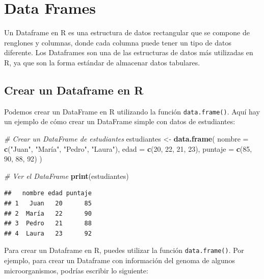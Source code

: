 \documentclass[
]{book}
\newenvironment{Shaded}{\begin{snugshade}}{\end{snugshade}}
\newcommand{\AttributeTok}[1]{\textcolor[rgb]{0.13,0.29,0.53}{#1}}
\newcommand{\CommentTok}[1]{\textcolor[rgb]{0.56,0.35,0.01}{\textit{#1}}}
\newcommand{\DecValTok}[1]{\textcolor[rgb]{0.00,0.00,0.81}{#1}}
\newcommand{\FunctionTok}[1]{\textcolor[rgb]{0.13,0.29,0.53}{\textbf{#1}}}
\newcommand{\NormalTok}[1]{#1}
\newcommand{\OtherTok}[1]{\textcolor[rgb]{0.56,0.35,0.01}{#1}}
\newcommand{\StringTok}[1]{\textcolor[rgb]{0.31,0.60,0.02}{#1}}
\begin{document}
\chapter{Data Frames}\label{data-frames}

Un Dataframe en R es una estructura de datos rectangular que se compone de renglones y columnas, donde cada columna puede tener un tipo de datos diferente. Los Dataframes son una de las estructuras de datos más utilizadas en R, ya que son la forma estándar de almacenar datos tabulares.

\section{Crear un Dataframe en R}\label{crear-un-dataframe-en-r}

Podemos crear un DataFrame en R utilizando la función \texttt{data.frame()}. Aquí hay un ejemplo de cómo crear un DataFrame simple con datos de estudiantes:

\begin{Shaded}
\begin{Highlighting}[]
\CommentTok{\# Crear un DataFrame de estudiantes}
\NormalTok{estudiantes }\OtherTok{\textless{}{-}} \FunctionTok{data.frame}\NormalTok{(}
  \AttributeTok{nombre =} \FunctionTok{c}\NormalTok{(}\StringTok{"Juan"}\NormalTok{, }\StringTok{"María"}\NormalTok{, }\StringTok{"Pedro"}\NormalTok{, }\StringTok{"Laura"}\NormalTok{),}
  \AttributeTok{edad =} \FunctionTok{c}\NormalTok{(}\DecValTok{20}\NormalTok{, }\DecValTok{22}\NormalTok{, }\DecValTok{21}\NormalTok{, }\DecValTok{23}\NormalTok{),}
  \AttributeTok{puntaje =} \FunctionTok{c}\NormalTok{(}\DecValTok{85}\NormalTok{, }\DecValTok{90}\NormalTok{, }\DecValTok{88}\NormalTok{, }\DecValTok{92}\NormalTok{)}
\NormalTok{)}

\CommentTok{\# Ver el DataFrame}
\FunctionTok{print}\NormalTok{(estudiantes)}
\end{Highlighting}
\end{Shaded}

\begin{verbatim}
##   nombre edad puntaje
## 1   Juan   20      85
## 2  María   22      90
## 3  Pedro   21      88
## 4  Laura   23      92
\end{verbatim}

Para crear un Dataframe en R, puedes utilizar la función \texttt{data.frame()}.
Por ejemplo, para crear un Dataframe con información del genoma de algunos microorganismos, podrías escribir lo siguiente:
\end{document}
